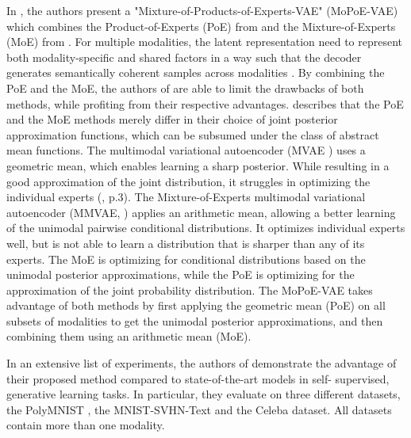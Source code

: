 	In \cite{thomas_gener-ELBO}, the authors present a "Mixture-of-Products-of-Experts-VAE" (MoPoE-VAE) which combines the Product-of-Experts (PoE) from \cite{wu2018multimodal} and the Mixture-of-Experts (MoE) from \cite{shi2019variational}.
	For multiple modalities, the latent representation need to represent both modality-specific and shared factors in a way such that the decoder generates semantically coherent samples across modalities \cite{shi2019variational}.
	By combining the PoE and the MoE, the authors of \cite{thomas_gener-ELBO} are able to limit the drawbacks of both methods, while profiting from their respective advantages.
	\cite{thomas_gener-ELBO} describes that the PoE and the MoE methods merely differ in their choice of joint posterior approximation functions, which can be subsumed under the class of abstract mean functions.
	The multimodal variational autoencoder (MVAE \cite{wu2018multimodal}) uses a geometric mean, which enables learning a sharp posterior.
	While resulting in a good approximation of the joint distribution, it struggles in optimizing the individual experts (\cite{wu2018multimodal}, p.3).
	The Mixture-of-Experts multimodal variational autoencoder (MMVAE, \cite{shi2019variational}) applies an arithmetic mean, allowing a better learning of the unimodal pairwise conditional distributions.
	It optimizes individual experts well, but is not able to learn a distribution that is sharper than any of its experts.
	The MoE is optimizing for conditional distributions based on the unimodal posterior approximations, while the PoE is optimizing for the approximation of the joint probability distribution.
	The MoPoE-VAE takes advantage of both methods by first applying the geometric mean (PoE) on all subsets of modalities to get the unimodal posterior approximations, and then combining them using an arithmetic mean (MoE).

	In an extensive list of experiments, the authors of \cite{thomas_gener-ELBO} demonstrate the advantage of their proposed method compared to state-of-the-art models in self- supervised, generative learning tasks.
	In particular, they evaluate on three different datasets, the PolyMNIST \cite{thomas_gener-ELBO}, the MNIST-SVHN-Text \cite{thomas_multimodal} and the Celeba dataset.
	All datasets contain more than one modality.




